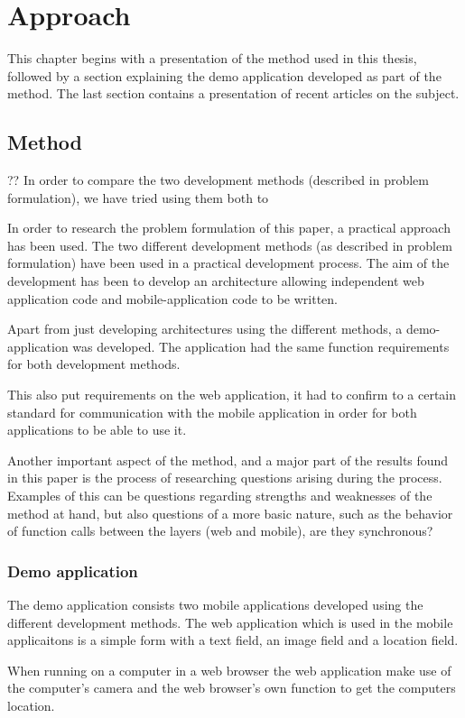 
\chapter{Approach}
This chapter begins with a presentation of the method used in this thesis, followed by a section explaining the demo application developed as part of the method. The last section contains a presentation of recent articles on the subject. 
\section{Method}
??
In order to compare the two development methods (described in problem formulation), we have tried using them both to 

In order to research the problem formulation of this paper, a practical approach has been used. The two different development methods (as described in problem formulation) have been used in a practical development process. The aim of the development has been to develop an architecture allowing independent web application code and mobile-application code to be written.

Apart from just developing architectures using the different methods, a demo-application was developed. The application had the same function requirements for both development methods.

This also put requirements on the web application, it had to confirm to a certain standard for communication with the mobile application in order for both applications to be able to use it. 

Another important aspect of the method, and a major part of the results found in this paper is the process of researching questions arising during the process. Examples of this can be questions regarding strengths and weaknesses of the method at hand, but also questions of a more basic nature, such as the behavior of function calls between the layers (web and mobile), are they synchronous?

\subsection{Demo application}
The demo application consists two mobile applications developed using the different development methods. The web application which is used in the mobile applicaitons is a simple form with a text field, an image field and a location field.

When running on a computer in a web browser the web application make use of the computer's camera and the web browser's own function to get the computers location.

